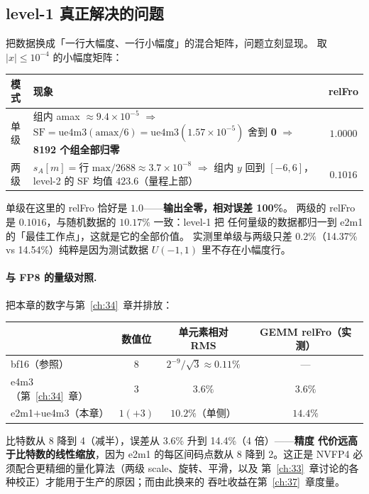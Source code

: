 \subsection{level-1 真正解决的问题}

把数据换成「一行大幅度、一行小幅度」的混合矩阵，问题立刻显现。
取 $|x|\le10^{-4}$ 的小幅度矩阵：

\begin{center}
\footnotesize
\begin{tabular}{llc}
\toprule
模式 & 现象 & relFro \\
\midrule
单级 & 组内 amax $\approx 9.4\times10^{-5}$
  $\Rightarrow$ $\mathrm{SF}=\mathrm{ue4m3}(\mathrm{amax}/6)
  = \mathrm{ue4m3}(1.57\times10^{-5})$ 舍到 \textbf{0}
  $\Rightarrow$ \textbf{8192 个组全部归零} & $\mathbf{1.0000}$ \\
两级 & $s_A[m] = \text{行 max}/2688 \approx 3.7\times10^{-8}$
  $\Rightarrow$ 组内 $y$ 回到 $[-6,6]$，
  level-2 的 SF 均值 $423.6$（量程上部） & $0.1016$ \\
\bottomrule
\end{tabular}
\end{center}

单级在这里的 relFro 恰好是 $1.0$——\textbf{输出全零，相对误差 100\%}。
两级的 relFro 是 $0.1016$，与随机数据的 $10.17\%$ 一致：level-1 把
任何量级的数据都归一到 e2m1 的「最佳工作点」，这就是它的全部价值。
实测里单级与两级只差 $0.2\%$（14.37\% vs 14.54\%）纯粹是因为测试数据
$U(-1,1)$ 里不存在小幅度行。

\paragraph{与 FP8 的量级对照.} 把本章的数字与第~\ref{ch:34}~章并排放：

\begin{center}
\footnotesize
\begin{tabular}{lccc}
\toprule
 & 数值位 & 单元素相对 RMS & GEMM relFro（实测） \\
\midrule
bf16（参照） & 8 & $2^{-9}/\sqrt3 \approx 0.11\%$ & --- \\
e4m3（第~\ref{ch:34}~章） & 3 & $3.6\%$ & $3.6\%$ \\
e2m1$+$ue4m3（本章） & $1(+3)$ & $10.2\%$（单侧） & $14.4\%$ \\
\bottomrule
\end{tabular}
\end{center}

比特数从 8 降到 4（减半），误差从 3.6\% 升到 14.4\%（4 倍）——\textbf{精度
代价远高于比特数的线性缩放}，因为 e2m1 的每区间码点数从 8 降到 2。这正是
NVFP4 必须配合更精细的量化算法（两级 scale、旋转、平滑，以及
第~\ref{ch:33}~章讨论的各种校正）才能用于生产的原因；而由此换来的
吞吐收益在第~\ref{ch:37}~章度量。

